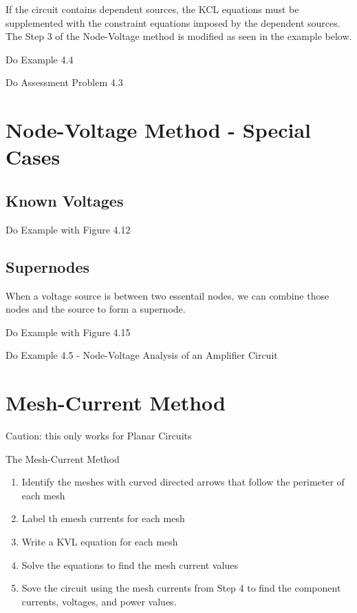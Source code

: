 \documentclass[14pt]{memoir}
\begin{document}
If the circuit contains dependent sources, the KCL equations must be supplemented with the constraint equations imposed by the dependent sources. The Step 3 of the Node-Voltage method is modified as seen in the example below.

\begin{tcolorbox}
Do Example 4.4
\end{tcolorbox}

\begin{tcolorbox}
Do Assessment Problem 4.3
\end{tcolorbox}

\section{Node-Voltage Method - Special Cases}

\subsection{Known Voltages}
\begin{tcolorbox}
Do Example with Figure 4.12
\end{tcolorbox}

\subsection{Supernodes}
When a voltage source is between two essentail nodes, we can combine those nodes and the source to form a supernode.

\begin{tcolorbox}
Do Example with Figure 4.15
\end{tcolorbox}

\begin{tcolorbox}
Do Example 4.5 - Node-Voltage Analysis of an Amplifier Circuit
\end{tcolorbox}

\section{Mesh-Current Method}
\begin{tcolorbox}
\begin{center}
Caution: this only works for Planar Circuits
\end{center}
\end{tcolorbox}


The Mesh-Current Method
\begin{enumerate}
\item Identify the meshes with curved directed arrows that follow the perimeter of each mesh
\item Label th emesh currents for each mesh
\item Write a KVL equation for each mesh
\item Solve the equations to find the mesh current values
\item Sove the circuit using the mesh currents from Step 4 to find the component currents, voltages, and power values.  
\end{enumerate}
\end{document}
